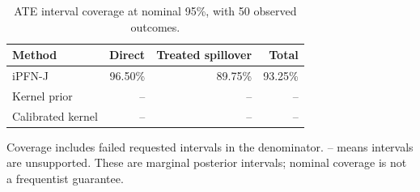 \begin{table}[tb]
\centering
\caption{ATE interval coverage at nominal 95\%, with 50 observed outcomes.}
\begin{tabular}{lrrr}
\toprule
Method & Direct & Treated spillover & Total \\
\midrule
iPFN-J & 96.50\% & 89.75\% & 93.25\% \\
Kernel prior & -- & -- & -- \\
Calibrated kernel & -- & -- & -- \\
\bottomrule
\end{tabular}
\par\smallskip
\begin{minipage}{\linewidth}\scriptsize
Coverage includes failed requested intervals in the denominator. -- means intervals are unsupported.
These are marginal posterior intervals; nominal coverage is not a frequentist guarantee.
\end{minipage}
\end{table}
